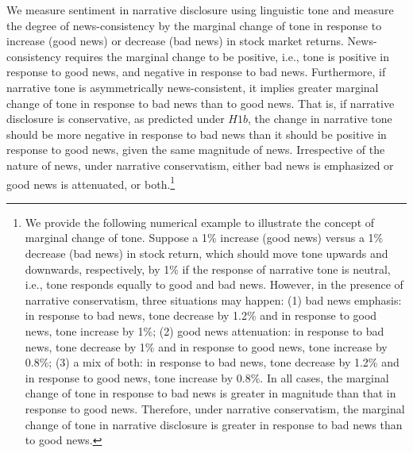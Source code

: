 \documentclass[letterpaper,12pt]{article}
\begin{document}
\begin{spacing}{1.5}
We measure sentiment in narrative disclosure using linguistic tone and measure the degree of news-consistency by the marginal change of tone in response to increase (good news) or decrease (bad news) in stock market returns. News-consistency requires the marginal change to be positive, i.e., tone is positive in response to good news, and negative in response to bad news. Furthermore, if narrative tone is asymmetrically news-consistent, it implies greater marginal change of tone in response to bad news than to good news. That is, if narrative disclosure is conservative, as predicted under $H1b$, the change in narrative tone should be more negative in response to bad news than it should be positive in response to good news, given the same magnitude of news. Irrespective of the nature of news, under narrative conservatism, either bad news is emphasized or good news is attenuated, or both.\footnote{We provide the following numerical example to illustrate the concept of marginal change of tone. Suppose a 1\% increase (good news) versus a 1\% decrease (bad news) in stock return, which should move tone upwards and downwards, respectively, by 1\% if the response of narrative tone is neutral, i.e., tone responds equally  to good and bad news. However, in the presence of narrative conservatism, three situations may happen: (1) bad news emphasis: in response to bad news, tone decrease by 1.2\% and in response to good news, tone increase by 1\%; (2) good news attenuation: in response to bad news, tone decrease by 1\% and in response to good news, tone increase by 0.8\%; (3) a mix of both: in response to bad news, tone decrease by 1.2\% and in response to good news, tone increase by 0.8\%. In all cases, the marginal change of tone in response to bad news is greater in magnitude than that in response to good news. Therefore, under narrative conservatism, the marginal change of tone in narrative disclosure is greater in response to bad news than to good news.} 


\end{spacing}
\end{document}
